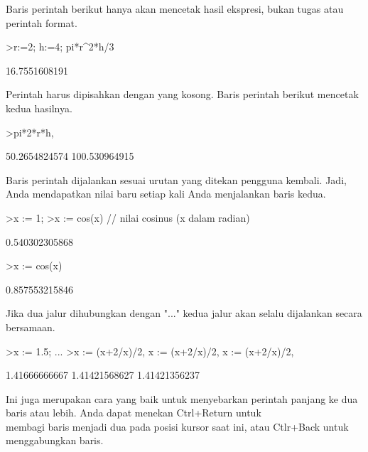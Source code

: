 \documentclass{article}
\begin{document}
\begin{eulernotebook}
\begin{eulercomment}
Baris perintah berikut hanya akan mencetak hasil ekspresi, bukan tugas
atau perintah format.
\end{eulercomment}
\begin{eulerprompt}
>r:=2; h:=4; pi*r^2*h/3
\end{eulerprompt}
\begin{euleroutput}
  16.7551608191
\end{euleroutput}
\begin{eulercomment}
Perintah harus dipisahkan dengan yang kosong. Baris perintah berikut
mencetak kedua hasilnya.
\end{eulercomment}
\begin{eulerprompt}
>pi*2*r*h, %
\end{eulerprompt}
\begin{euleroutput}
  50.2654824574
  100.530964915
\end{euleroutput}
\begin{eulercomment}
Baris perintah dijalankan sesuai urutan yang ditekan pengguna kembali.
Jadi, Anda mendapatkan nilai baru setiap kali Anda menjalankan baris
kedua.
\end{eulercomment}
\begin{eulerprompt}
>x := 1;
>x := cos(x) // nilai cosinus (x dalam radian)
\end{eulerprompt}
\begin{euleroutput}
  0.540302305868
\end{euleroutput}
\begin{eulerprompt}
>x := cos(x)
\end{eulerprompt}
\begin{euleroutput}
  0.857553215846
\end{euleroutput}
\begin{eulercomment}
Jika dua jalur dihubungkan dengan "..." kedua jalur akan selalu
dijalankan secara bersamaan.
\end{eulercomment}
\begin{eulerprompt}
>x := 1.5; ...
>x := (x+2/x)/2, x := (x+2/x)/2, x := (x+2/x)/2, 
\end{eulerprompt}
\begin{euleroutput}
  1.41666666667
  1.41421568627
  1.41421356237
\end{euleroutput}
\begin{eulercomment}
Ini juga merupakan cara yang baik untuk menyebarkan perintah panjang
ke dua baris atau lebih. Anda dapat menekan Ctrl+Return untuk\\
membagi baris menjadi dua pada posisi kursor saat ini, atau Ctlr+Back
untuk menggabungkan baris.


\end{eulercomment}
\end{eulernotebook}
\end{document}
